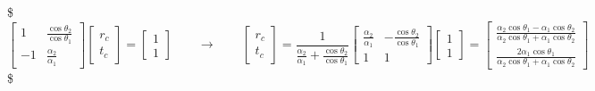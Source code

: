 \documentclass[letterpaper,10pt,italian]{jupyterBook}
\begin{document}
\sphinxAtStartPar
{} 
\$\(
\begin{bmatrix} 1 & \frac{\cos \theta_2}{\cos \theta_1} \\ -1 & \frac{\alpha_2}{\alpha_1} \end{bmatrix}
 \begin{bmatrix} r_c \\ t_c \end{bmatrix} = \begin{bmatrix} 1 \\ 1 \end{bmatrix}
\qquad \rightarrow \qquad
\begin{bmatrix} r_c \\ t_c \end{bmatrix} = \dfrac{1}{\frac{\alpha_2}{\alpha_1} + \frac{\cos \theta_2}{\cos \theta_1}} \begin{bmatrix} \frac{\alpha_2}{\alpha_1} & - \frac{\cos \theta_2}{\cos \theta_1} \\ 1 & 1  \end{bmatrix} \begin{bmatrix} 1 \\ 1 \end{bmatrix} 
= \begin{bmatrix} \frac{\alpha_2 \cos \theta_1 - \alpha_1 \cos \theta_2}{\alpha_2 \cos \theta_1 + \alpha_1 \cos \theta_2} \\ \frac{2 \alpha_1 \cos \theta_1}{\alpha_2 \cos \theta_1 + \alpha_1 \cos \theta_2} \end{bmatrix}
\)\$
\end{document}
